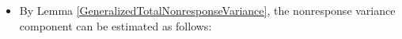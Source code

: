 \begin{itemize}
\begin{equation*}
            \right)
        \!
        \left(\,
            \dfrac{1}{\pi_{k}}\,
            \underset{l\in\mathcal{C}_{k}}{\sum}\,
            \alpha_{kl}\,y_{kl}
            \right)
    \end{equation*}
    and
    \begin{equation*}
    \widetilde{y}_{ij}
    \; := \;
        \left\{\begin{array}{cl}
            y_{ij}, & \textnormal{for \,$i \in s$,\, $j \,\in\, (\mathcal{C}_{i})_{R}$}
            \\
            \overset{{\color{white}\textnormal{\large1}}}{\mu_{ij}}, & \textnormal{for \,$i \in s$,\, $j \,\in\, (\mathcal{C}_{i})_{M} \,:=\, \mathcal{C}_{i} \,\backslash\, (\mathcal{C}_{i})_{R}$}
            \end{array}\right.
    \end{equation*}
\item
    By Lemma \ref{GeneralizedTotalNonresponseVariance},
    the nonresponse variance component can be estimated as follows:

\end{itemize}
